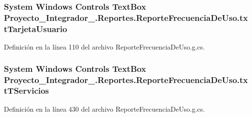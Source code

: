 \hypertarget{class_proyecto___integrador__3_1_1_reportes_1_1_reporte_frecuencia_de_uso_a2282faf2e30330dc4f45b9bc0264ceaf}{
\subsubsection[{txt\-Tarjeta\-Usuario}]{\setlength{\rightskip}{0pt plus 5cm}System Windows Controls Text\-Box Proyecto\-\_\-\-Integrador\-\_.\-Reportes.\-Reporte\-Frecuencia\-De\-Uso.\-txt\-Tarjeta\-Usuario\hspace{0.3cm}{\ttfamily [package]}}}\label{class_proyecto___integrador__3_1_1_reportes_1_1_reporte_frecuencia_de_uso_a2282faf2e30330dc4f45b9bc0264ceaf}


Definición en la línea 110 del archivo Reporte\-Frecuencia\-De\-Uso.\-g.\-cs.

\hypertarget{class_proyecto___integrador__3_1_1_reportes_1_1_reporte_frecuencia_de_uso_a64a10f33c6df7de8fee16db2bccdfdeb}{
\subsubsection[{txt\-T\-Servicios}]{\setlength{\rightskip}{0pt plus 5cm}System Windows Controls Text\-Box Proyecto\-\_\-\-Integrador\-\_.\-Reportes.\-Reporte\-Frecuencia\-De\-Uso.\-txt\-T\-Servicios\hspace{0.3cm}{\ttfamily [package]}}}\label{class_proyecto___integrador__3_1_1_reportes_1_1_reporte_frecuencia_de_uso_a64a10f33c6df7de8fee16db2bccdfdeb}


Definición en la línea 430 del archivo Reporte\-Frecuencia\-De\-Uso.\-g.\-cs.

